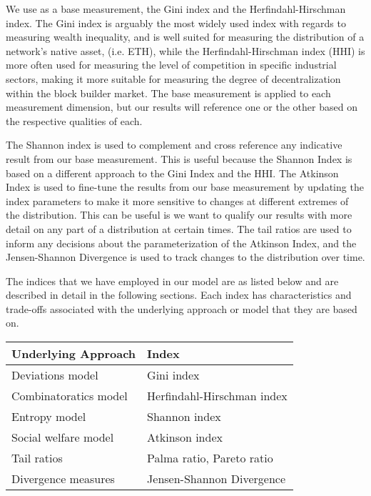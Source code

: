 \documentclass[conference]{IEEEtran}
\begin{document}
We use as a base measurement, the Gini index and the Herfindahl-Hirschman index. The Gini index is arguably the most widely used index with regards to measuring wealth inequality, and is well suited for measuring the distribution of a network's native asset, (i.e. ETH), while the Herfindahl-Hirschman index (HHI) is more often used for measuring the level of competition in specific industrial sectors, making it more suitable for measuring the degree of decentralization within the block builder market.  The base measurement is applied to each measurement dimension, but our results will reference one or the other based on the respective qualities of each.

The Shannon index is used to complement and cross reference any indicative result from our base measurement.  This is useful because the Shannon Index is based on a different approach to the Gini Index and the HHI.  The Atkinson Index is used to fine-tune the results from our base measurement by updating the index parameters to make it more sensitive to changes at different extremes of the distribution.  This can be useful is we want to qualify our results with more detail on any part of a distribution at certain times.  The tail ratios are used to inform any decisions about the parameterization of the Atkinson Index, and the Jensen-Shannon Divergence is used to track changes to the distribution over time.

The indices that we have employed in our model are as listed below and are described in detail in the following sections.  Each index has characteristics and trade-offs associated with the underlying approach or model that they are based on.

\vspace{6pt}

\begin{center}
\begin{tabular}{|l|l|}
\hline
\textbf{Underlying Approach} & \textbf{Index} \\ \hline
Deviations model & Gini index \\ \hline
Combinatoratics model & Herfindahl-Hirschman index \\ \hline
Entropy model & Shannon index \\ \hline
Social welfare model & Atkinson index \\ \hline
Tail ratios & Palma ratio, Pareto ratio \\ \hline
Divergence measures & Jensen-Shannon Divergence \\ \hline
\end{tabular}
\end{center}
\end{document}
